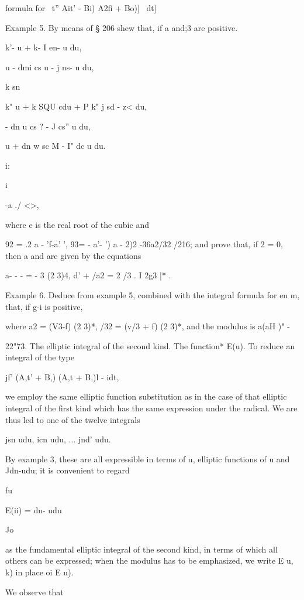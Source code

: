 formula for \ t'' Ait' - Bi) A2fi + Bo)]~ dt]


Example 5. By means of § 206 shew that, if a and;3 are positive.

k'- u + k- I en- u du,

u - dmi cs u - j ns- u du,

k sn %

k" u + k SQU cdu + P k" j sd - z< du,

- dn u cs ? - J cs'' u du,

u + dn w sc M - I" dc u du.

i:

 i

-a ./ <>,

where e is the real root of the cubic and

92 = .2 a - 'f-a' ', 93= - a'- ') a - 2)2 -36a2/32 /216; and prove
that, if 2 = 0, then a and are given by the equations

a- - - = - 3 (2 3)4, d' + /a2 = 2 /3 . I 2g3 |* .

%
%

Example 6. Deduce from example 5, combined with the integral formula
for en m, that, if g-i is positive,

where a2 = (V3-f) (2 3)*, /32 = (v/3 + f) (2 3)*, and the modulus is
a(aH )" -

22"73. The elliptic integral of the second kind. The function* E(u).
To reduce an integral of the type

jf' (A,t' + B,) (A,t + B,)l - idt,

we employ the same elliptic function substitution as in the case of
that elliptic integral of the first kind which has the same expression
under the radical. We are thus led to one of the twelve integrals

jsn udu, icn udu, ... jnd' udu.

By example 3, these are all expressible in terms of u,
elliptic functions of u and Jdn-udu; it is convenient to regard

fu

E(ii) = dn- udu

Jo

as the fundamental elliptic integral of the second kind, in terms of
which all others can be expressed; when the modulus has to be
emphasized, we write E u, k) in place oi E u).

We observe that

